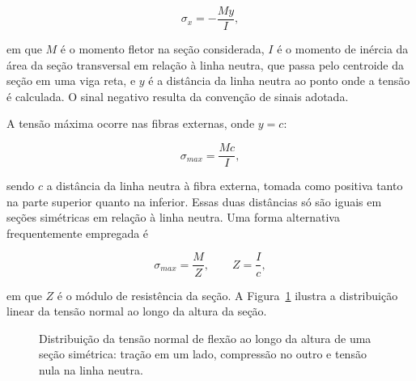 \documentclass[arial,centeredequations,english,brazilian,oneside,section=TITLE]{ifes8}
\begin{document}
\begin{equation}
  \label{eq:sigma-flexao}
  \sigma_x = -\frac{M y}{I},
\end{equation}

em que $M$ é o momento fletor na seção considerada, $I$ é o momento de inércia da área
da seção transversal em relação à linha neutra, que passa pelo centroide da seção
em uma viga reta, e $y$ é a distância da linha neutra ao ponto onde a tensão é
calculada. O sinal negativo resulta da convenção de sinais
adotada.

A tensão máxima ocorre nas fibras externas, onde $y = c$:

\begin{equation}
  \label{eq:sigma-max}
  \sigma_{max} = \frac{M c}{I},
\end{equation}

sendo $c$ a distância da linha neutra à fibra externa, tomada como positiva tanto
na parte superior quanto na inferior. Essas duas distâncias só são iguais em seções
simétricas em relação à linha neutra. Uma forma alternativa
frequentemente empregada é

\begin{equation}
  \label{eq:sigma-Z}
  \sigma_{max} = \frac{M}{Z}, \qquad Z = \frac{I}{c},
\end{equation}

em que $Z$ é o módulo de resistência da seção. A
Figura~\ref{fig:distribuicao-tensao} ilustra a distribuição linear da tensão normal ao
longo da altura da seção.

\begin{figure}[h]
  \centering
  \caption{Distribuição da tensão normal de flexão ao longo da altura de uma seção
    simétrica: tração em um lado, compressão no outro e tensão nula na linha neutra.}
  \label{fig:distribuicao-tensao}
\end{figure}
\end{document}
